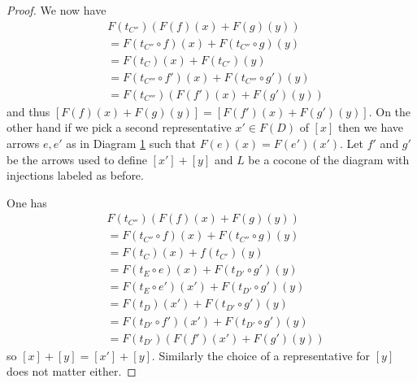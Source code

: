 \begin{proof}
  \noindent We now have
  \begin{align*}
    &F(t_{C''})(F(f)(x)+F(g)(y))\\
    &= F(t_{C''}\circ f)(x) + F(t_{C''}\circ g)(y)\\
    &= F(t_C)(x) + F(t_{C'})(y)\\
    &= F(t_{C'''}\circ f')(x) + F(t_{C'''}\circ g')(y)\\
    &= F(t_{C'''})(F(f')(x) + F(g')(y))
  \end{align*}
  and thus \([F(f)(x)+F(g)(y)]=[F(f')(x)+F(g')(y)]\).
  On the other hand if we pick a second representative \(x'\in F(D)\) of \([x]\) then we have arrows \(e,e'\) as in Diagram \ref{diagram:rel2} such that \(F(e)(x)=F(e')(x')\).
  Let \(f'\) and \(g'\) be the arrows used to define \([x']+[y]\) and \(L\) be a cocone of the diagram with injections labeled as before.
  \begin{figure}[h]
    \begin{center}
    \end{center}
    \caption{}
    \label{diagram:rel2}
  \end{figure}

  \noindent One has
  \begin{align*}
    &F(t_{C''})(F(f)(x)+F(g)(y))\\
    &=F(t_{C''}\circ f)(x) + F(t_{C''}\circ g)(y)\\
    &=F(t_C)(x) + f(t_{C'})(y)\\
    &=F(t_E\circ e)(x) + F(t_{D'}\circ g')(y)\\
    &=F(t_E\circ e')(x') + F(t_{D'}\circ g')(y)\\
    &=F(t_D)(x') + F(t_{D'}\circ g')(y)\\
    &=F(t_{D'}\circ f')(x') + F(t_{D'}\circ g')(y)\\
    &=F(t_{D'})(F(f')(x') + F(g')(y))
  \end{align*}
  so \([x]+[y] = [x']+[y]\).
  Similarly the choice of a representative for \([y]\) does not matter either.
  

\end{proof}

